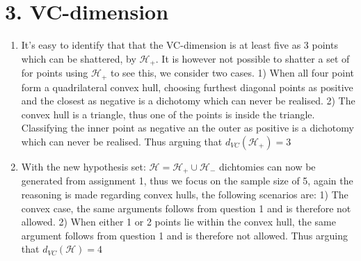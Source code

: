 \documentclass{article}
\begin{document}
\section{3. VC-dimension}
\begin{enumerate}

\item{
It's easy to identify that that the VC-dimension is at least five as 3 points which can be shattered, by $\mathcal{H_+}$. It is however not possible to shatter a set of for points using $\mathcal{H_+}$ to see this, we consider two cases. 1) When all four point form a quadrilateral convex hull, choosing furthest diagonal points as positive and the closest as negative is a dichotomy which can never be realised. 2) The convex hull is a triangle, thus one of the points is inside the triangle. Classifying the inner point as negative an the outer as positive is a dichotomy which can never be realised. Thus arguing that $d_{VC}(\mathcal{H}_+) = 3$ 
}
\item{
With the new hypothesis set: $\mathcal{H} = \mathcal{H}_+ \cup \mathcal{H}_-$ dichtomies can now be generated from assignment 1, thus we focus on the sample size of 5, again the reasoning is made regarding convex hulls, the following scenarios are:
1) The convex case, the same arguments follows from question 1 and is therefore not allowed. 2) When either 1 or 2 points lie within the convex hull, the same argument follows from question 1 and is therefore not allowed. Thus arguing that $d_{VC}(\mathcal{H}) = 4$ 
}

\end{enumerate}
\end{document}
